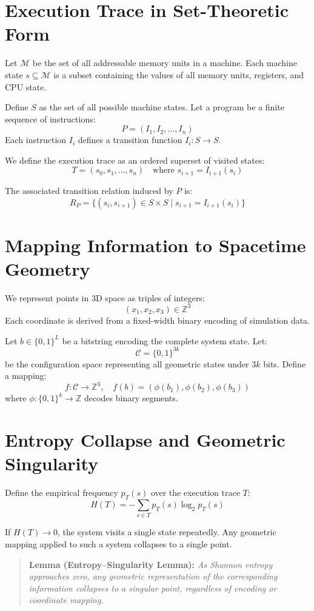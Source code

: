 \documentclass[11pt]{article}
\begin{document}
\section{Execution Trace in Set-Theoretic Form}

Let $\mathcal{M}$ be the set of all addressable memory units in a machine. Each machine state $s \subseteq \mathcal{M}$ is a subset containing the values of all memory units, registers, and CPU state.

Define $S$ as the set of all possible machine states. Let a program be a finite sequence of instructions:
\[
  P = (I_1, I_2, \dots, I_n)
\]
Each instruction $I_i$ defines a transition function $I_i : S \to S$.

We define the execution trace as an ordered superset of visited states:
\[
  T = (s_0, s_1, \dots, s_n) \quad \text{where } s_{i+1} = I_{i+1}(s_i)
\]

The associated transition relation induced by $P$ is:
\[
  R_P = \{ (s_i, s_{i+1}) \in S \times S \mid s_{i+1} = I_{i+1}(s_i) \}
\]

\section{Mapping Information to Spacetime Geometry}

We represent points in 3D space as triples of integers:
\[
  (x_1, x_2, x_3) \in \mathbb{Z}^3
\]
Each coordinate is derived from a fixed-width binary encoding of simulation data.

Let $b \in \{0,1\}^L$ be a bitstring encoding the complete system state. Let:
\[
  \mathcal{C} = \{0,1\}^{3k}
\]
be the configuration space representing all geometric states under $3k$ bits. Define a mapping:
\[
  f : \mathcal{C} \to \mathbb{Z}^3, \quad f(b) = (\phi(b_1), \phi(b_2), \phi(b_3))
\]
where $\phi : \{0,1\}^k \to \mathbb{Z}$ decodes binary segments.

\section{Entropy Collapse and Geometric Singularity}

Define the empirical frequency $p_T(s)$ over the execution trace $T$:
\[
  H(T) = -\sum_{s \in T} p_T(s) \log_2 p_T(s)
\]

If $H(T) \to 0$, the system visits a single state repeatedly. Any geometric mapping applied to such a system collapses to a single point.

\begin{quote}
  \textbf{Lemma (Entropy--Singularity Lemma):}
  \emph{As Shannon entropy approaches zero, any geometric representation of the corresponding information collapses to a singular point, regardless of encoding or coordinate mapping.}
\end{quote}
\end{document}
